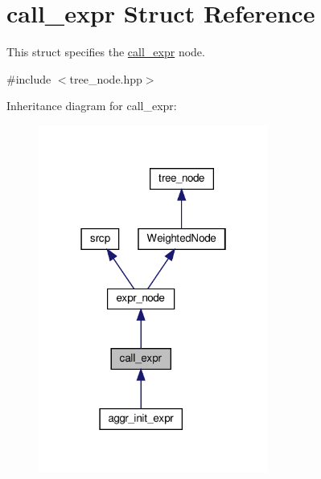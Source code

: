 \hypertarget{structcall__expr}{}\section{call\+\_\+expr Struct Reference}
\label{structcall__expr}


This struct specifies the \hyperlink{structcall__expr}{call\+\_\+expr} node.  




{\ttfamily \#include $<$tree\+\_\+node.\+hpp$>$}



Inheritance diagram for call\+\_\+expr\+:
\nopagebreak
\begin{figure}[H]
\begin{center}
\leavevmode
\includegraphics[width=214pt]{d1/d16/structcall__expr__inherit__graph}
\end{center}
\end{figure}


